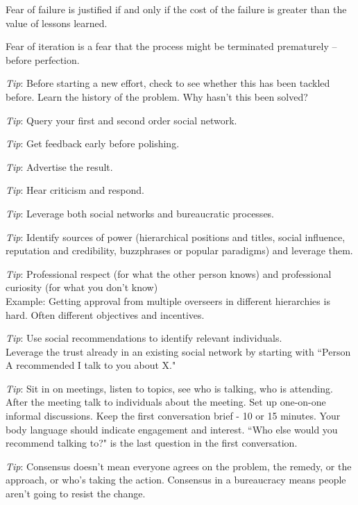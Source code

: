 Fear of failure is justified if and only if the cost of the failure is greater than the value of lessons learned.

Fear of iteration is a fear that the process might be terminated prematurely -- before perfection.

\textit{Tip}: Before starting a new effort, check to see whether this has been tackled before.
Learn the history of the problem. Why hasn't this been solved?

\textit{Tip}: Query your first and second order social network.

\textit{Tip}: Get feedback early  before polishing.

\textit{Tip}: Advertise the result.

\textit{Tip}: Hear criticism and respond.

\textit{Tip}: Leverage both social networks and bureaucratic processes. 

\textit{Tip}: Identify sources of power (hierarchical positions and titles, social influence, reputation and credibility, buzzphrases or popular paradigms) and leverage them.

\textit{Tip}: Professional respect (for what the other person knows) and professional curiosity (for what you don't know) \\
Example: Getting approval from multiple overseers in different hierarchies is hard. Often different objectives and incentives.

\textit{Tip}: Use social recommendations to identify relevant individuals.\\
Leverage the trust already in an existing social network by starting with ``Person A recommended I talk to you about X."

\textit{Tip}: Sit in on meetings, listen to topics, see who is talking, who is attending. After the meeting talk to individuals about the meeting. Set up one-on-one informal discussions. Keep the first conversation  brief - 10 or 15 minutes. Your body language should indicate engagement and interest. ``Who else would you recommend talking to?" is the last question in the first conversation.


\textit{Tip}: Consensus doesn't mean everyone agrees on the problem, the remedy, or the approach, or who's taking the action. Consensus in a bureaucracy means people aren't going to resist the change.